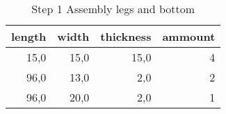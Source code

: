 \begin{table}[h!]
\centering
\caption{Step 1 Assembly legs and bottom}
\begin{tabular}{rrrr}
\toprule
 length &  width &  thickness &  ammount \\
\midrule
   15,0 &   15,0 &       15,0 &        4 \\
   96,0 &   13,0 &        2,0 &        2 \\
   96,0 &   20,0 &        2,0 &        1 \\
\bottomrule
\end{tabular}
\end{table}
